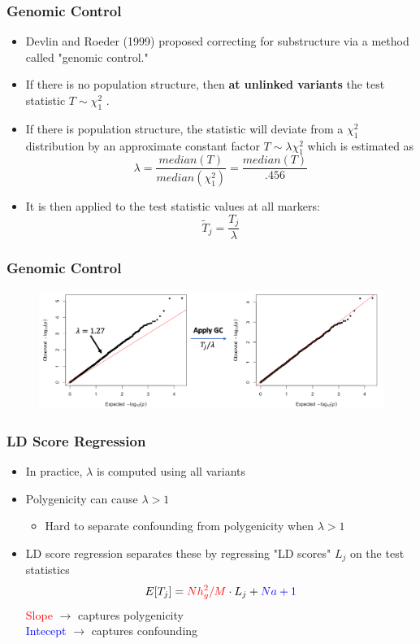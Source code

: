 \documentclass{beamer}
\begin{document}
\begin{frame}
\frametitle{\bf Genomic Control}
\begin{itemize}
\item Devlin and Roeder (1999) proposed correcting for substructure via a method called "genomic control."
\item If there is no population structure, then \textbf{at unlinked variants} the test statistic $T\sim \chi^{2}_1$ . \item   If there is population structure, the statistic will deviate from a $\chi^{2}_1$ distribution by an approximate constant factor  $T\sim \lambda\chi^{2}_1$ which is estimated as $$\lambda=\frac{median(T)}{median(\chi^{2}_1)}=\frac{median(T)}{.456}$$
\item    It is then applied to the test statistic values at all markers:
\[ \tilde{T}_j=\frac{T_j}{\lambda}\]
\end{itemize}
\end{frame}

\begin{frame}
	\frametitle{\bf Genomic Control}
\begin{figure}
	\includegraphics[scale=.4]{Figures/lgc_ex}
\end{figure}
\end{frame}


\begin{frame}
	\frametitle{\bf LD Score Regression}
	\begin{itemize}
		\item In practice,  $\lambda$ is computed using all variants
		\item Polygenicity can cause $\lambda > 1$
		\begin{itemize}
			\item Hard to separate confounding from polygenicity when $\lambda > 1$
		\end{itemize}
		\item LD score regression separates these by regressing "LD scores" $L_j$ on the test statistics
		$$ E[T_j] = {\color{red} Nh^2_g/M }\cdot L_j + {\color{blue} Na + 1} $$
		\textcolor{red}{Slope} $\rightarrow $ captures polygenicity\\
	\textcolor{blue}{Intecept} $\rightarrow $ captures confounding
	\end{itemize}
\end{frame}
\end{document}
